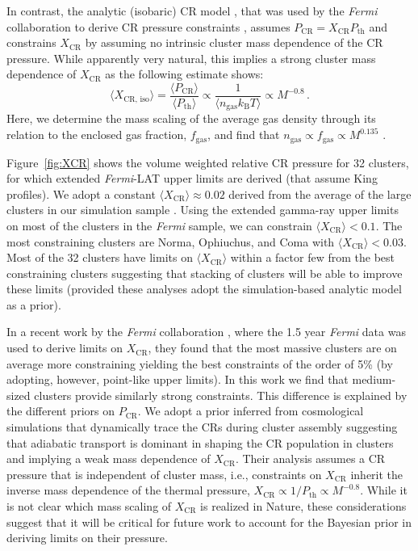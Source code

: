 \documentclass[10pt,aps,pra,reprint,amsmath,amsfonts,amssymb,showpacs,nofootinbib,floatfix]{revtex4-1}
\newcommand{\Fermi}{{\em Fermi}\xspace}
\newcommand{\rmn}{\mathrm}
\newcommand{\B}{\rmn{B}}
\newcommand{\bra}{\langle}
\newcommand{\ket}{\rangle}
\newcommand{\CR}{\rmn{CR}}
\begin{document}
In contrast, the analytic (isobaric) CR model
\cite{2004A&A...413...17P}, that was used by the \Fermi collaboration
to derive CR pressure constraints \cite{2010ApJ...717L..71A}, assumes
$P_\CR = X_\CR P_\rmn{th}$ and constrains $X_\CR$ by assuming no
intrinsic cluster mass dependence of the CR pressure. While
apparently very natural, this implies a strong cluster mass dependence
of $X_\CR$ as the following estimate shows:
\begin{equation}
    \bra X_{\CR,\,\rmn{iso}}\ket = \frac{\bra P_\CR\ket}{\bra P_\rmn{th}\ket}
    \propto \frac{1}{\bra n_\rmn{gas} k_\B T\ket} \propto M^{-0.8}\,.
\end{equation}
Here, we determine the mass scaling of the average gas density through
its relation to the enclosed gas fraction, $f_\rmn{gas}$, and find
that $n_\rmn{gas}\propto f_\rmn{gas} \propto M^{0.135}$
\cite{2009ApJ...693.1142S}.

Figure~\ref{fig:XCR} shows the volume weighted relative CR pressure
for 32 clusters, for which extended \Fermi-LAT upper limits are
derived (that assume King profiles). We adopt a constant $\bra
X_\CR\ket\approx 0.02$ derived from the average of the large clusters
in our simulation sample \cite{2008MNRAS.385.1211P,
  2010MNRAS.409..449P}. Using the extended gamma-ray upper limits on
most of the clusters in the \Fermi sample, we can constrain $\bra
X_\CR \ket< 0.1$. The most constraining clusters are Norma, Ophiuchus,
and Coma with $\bra X_\CR\ket < 0.03$. Most of the 32 clusters have
limits on $\bra X_\CR\ket$ within a factor few from the best
constraining clusters suggesting that stacking of clusters will be
able to improve these limits (provided these analyses adopt the
simulation-based analytic model \cite{2010MNRAS.409..449P} as a
prior).

In a recent work by the \Fermi collaboration
\cite{2010ApJ...717L..71A}, where the 1.5 year \Fermi data was used to
derive limits on $X_\CR$, they found that the most massive clusters
are on average more constraining yielding the best constraints of the
order of 5\% (by adopting, however, point-like upper limits). In this
work we find that medium-sized clusters provide similarly strong
constraints. This difference is explained by the different priors on
$P_\CR$. We adopt a prior inferred from cosmological simulations that
dynamically trace the CRs during cluster assembly suggesting that
adiabatic transport is dominant in shaping the CR population in
clusters and implying a weak mass dependence of $X_\CR$. Their
analysis assumes a CR pressure that is independent of cluster mass,
i.e., constraints on $X_\CR$ inherit the inverse mass dependence of
the thermal pressure, $X_\CR\propto 1/P_\rmn{th}\propto
M^{-0.8}$. While it is not clear which mass scaling of $X_\CR$ is
realized in Nature, these considerations suggest that it will be
critical for future work to account for the Bayesian prior in deriving
limits on their pressure.
\end{document}

